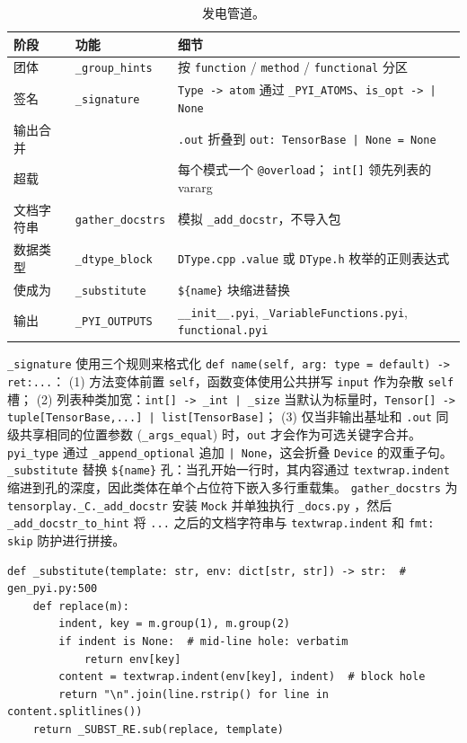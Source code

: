 \begin{table}[H]
\centering
\caption{发电管道。}
\label{tab:pyi}
\small
\begin{tabular}{lll}
\toprule
阶段 & 功能 & 细节 \\
\midrule
团体 & \texttt{\_group\_hints} & 按 \texttt{function} / \texttt{method} / \texttt{functional} 分区 \\
签名 & \texttt{\_signature} & \texttt{Type -> atom} 通过 \texttt{\_PYI\_ATOMS}、\texttt{is\_opt -> | None} \\
输出合并 &  & \texttt{.out} 折叠到 \texttt{out: TensorBase | None = None} \\
超载 &  & 每个模式一个 \texttt{@overload}； \texttt{int[]} 领先列表的 vararg \\
文档字符串 & \texttt{gather\_docstrs} & 模拟 \texttt{\_add\_docstr}，不导入包 \\
数据类型 & \texttt{\_dtype\_block} & \texttt{DType.cpp} \texttt{.value} 或 \texttt{DType.h} 枚举的正则表达式 \\
使成为 & \texttt{\_substitute} & \texttt{\$\{name\}} 块缩进替换 \\
输出 & \texttt{\_PYI\_OUTPUTS} & \texttt{\_\_init\_\_.pyi}, \texttt{\_VariableFunctions.pyi}, \texttt{functional.pyi} \\
\bottomrule
\end{tabular}
\end{table}

\texttt{\_signature} 使用三个规则来格式化 \texttt{def name(self, arg: type = default) -> ret:...}： (1) 方法变体前置 \texttt{self}，函数变体使用公共拼写 \texttt{input} 作为杂散 \texttt{self} 槽； (2) 列表种类加宽：\texttt{int[] -> \_int | \_size} 当默认为标量时，\texttt{Tensor[] -> tuple[TensorBase,...] | list[TensorBase]}； (3) 仅当非输出基址和 \texttt{.out} 同级共享相同的位置参数 (\texttt{\_args\_equal}) 时，\texttt{out} 才会作为可选关键字合并。 \texttt{pyi\_type} 通过 \texttt{\_append\_optional} 追加 \texttt{| None}，这会折叠 \texttt{Device} 的双重子句。 \texttt{\_substitute} 替换 \texttt{\$\{name\}} 孔：当孔开始一行时，其内容通过 \texttt{textwrap.indent} 缩进到孔的深度，因此类体在单个占位符下嵌入多行重载集。 \texttt{gather\_docstrs} 为 \texttt{tensorplay.\_C.\_add\_docstr} 安装 \texttt{Mock} 并单独执行 \texttt{\_docs.py} ，然后 \texttt{\_add\_docstr\_to\_hint} 将 \texttt{...} 之后的文档字符串与 \texttt{textwrap.indent} 和 \texttt{fmt: skip} 防护进行拼接。

\begin{lstlisting}[caption={template substitution.}, label=lst:pyisubst, style=pystyle]
def _substitute(template: str, env: dict[str, str]) -> str:  # gen_pyi.py:500
    def replace(m):
        indent, key = m.group(1), m.group(2)
        if indent is None:  # mid-line hole: verbatim
            return env[key]
        content = textwrap.indent(env[key], indent)  # block hole
        return "\n".join(line.rstrip() for line in content.splitlines())
    return _SUBST_RE.sub(replace, template)
\end{lstlisting}

